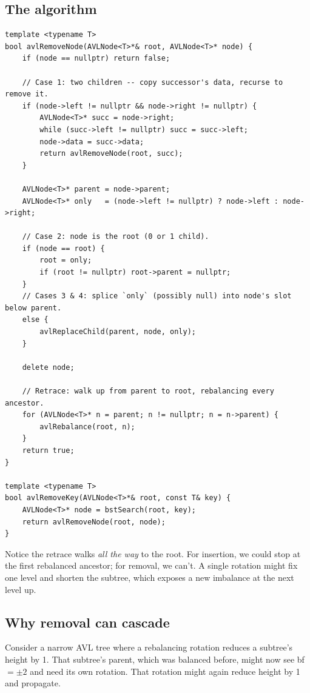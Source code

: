 \documentclass[11pt]{article}
\begin{document}
\subsection*{The algorithm}

\begin{lstlisting}
template <typename T>
bool avlRemoveNode(AVLNode<T>*& root, AVLNode<T>* node) {
    if (node == nullptr) return false;

    // Case 1: two children -- copy successor's data, recurse to remove it.
    if (node->left != nullptr && node->right != nullptr) {
        AVLNode<T>* succ = node->right;
        while (succ->left != nullptr) succ = succ->left;
        node->data = succ->data;
        return avlRemoveNode(root, succ);
    }

    AVLNode<T>* parent = node->parent;
    AVLNode<T>* only   = (node->left != nullptr) ? node->left : node->right;

    // Case 2: node is the root (0 or 1 child).
    if (node == root) {
        root = only;
        if (root != nullptr) root->parent = nullptr;
    }
    // Cases 3 & 4: splice `only` (possibly null) into node's slot below parent.
    else {
        avlReplaceChild(parent, node, only);
    }

    delete node;

    // Retrace: walk up from parent to root, rebalancing every ancestor.
    for (AVLNode<T>* n = parent; n != nullptr; n = n->parent) {
        avlRebalance(root, n);
    }
    return true;
}

template <typename T>
bool avlRemoveKey(AVLNode<T>*& root, const T& key) {
    AVLNode<T>* node = bstSearch(root, key);
    return avlRemoveNode(root, node);
}
\end{lstlisting}

Notice the retrace walks \emph{all the way} to the root. For insertion, we could stop at the first rebalanced ancestor; for removal, we can't. A single rotation might fix one level and shorten the subtree, which exposes a new imbalance at the next level up.

\subsection*{Why removal can cascade}

\begin{center}
Consider a narrow AVL tree where a rebalancing rotation reduces a subtree's height by 1. That subtree's parent, which was balanced before, might now see bf $= \pm 2$ and need its own rotation. That rotation might again reduce height by 1 and propagate.
\end{center}
\end{document}
